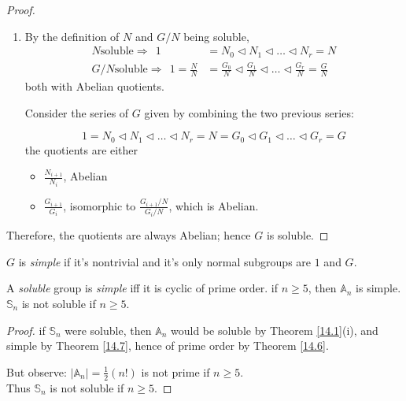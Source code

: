 \documentclass{article}
\theoremstyle{definition}
\newenvironment{defn}[1]
{\renewcommand\theinnerdefn{#1}\innerdefn}
{\endinnerdefn}
\newenvironment{thm}[1]
{\renewcommand\theinnerthm{#1}\innerthm}
{\endinnerthm}
\newenvironment{cor}[1]
{\renewcommand\theinnercor{#1}\innercor}
{\endinnercor}
\begin{document}
\begin{proof}
\begin{enumerate}
      (*): by the 2nd Isomorphism Theorem (\ref{2ndisothm}).

      The last quotient is a quotient of the Abelian group $G_{i+1}/G_i$, so it is Abelian.

      Hence, $\frac{G_{i+1}N}{G_i N}$ is also Abelian; so $\frac{G}{N}$ is soluble.

    \item
      By the definition of $N$ and $G/N$ being soluble,
      \begin{align*}
	N \text{soluble} \Longrightarrow~~ 1 &= N_0 \triangleleft N_1 \triangleleft \ldots \triangleleft N_r = N\\
	G/N \text{soluble} \Longrightarrow~~ 1= \frac{N}{N} &= \frac{G_0}{N} \triangleleft \frac{G_1}{N} \triangleleft \ldots \triangleleft \frac{G_r}{N} = \frac{G}{N}
    \end{align*}
    both with Abelian quotients.

    Consider the series of $G$ given by combining the two previous series:

    $$
      1 = N_0 \triangleleft N_1 \triangleleft \ldots \triangleleft N_r = N = G_0 \triangleleft G_1 \triangleleft \ldots \triangleleft G_r = G
    $$
    the quotients are either
    \begin{itemize}
      \item $\frac{N_{i+1}}{N_i}$, Abelian
      \item $\frac{G_{i+1}}{G_i}$, isomorphic to $\frac{G_{i+1}/N}{G_i/N}$,
	which is Abelian.
    \end{itemize}
  \end{enumerate}
  Therefore, the quotients are always Abelian; hence $G$ is soluble.
\end{proof}


\begin{defn}{14.5}
  $G$ is \emph{simple} if it's nontrivial and it's only normal subgroups are $1$ and $G$.
\end{defn}

\begin{thm}{14.6} \label{14.6}
  A \emph{soluble} group is \emph{simple} iff it is cyclic of prime order.
\end{thm}
\begin{thm}{14.7} \label{14.7}
  if $n \geq 5$, then $\mathbb{A}_n$ is simple.
\end{thm}
\begin{cor}{14.8}
  $\mathbb{S}_n$ is not soluble if $n \geq 5$.
\end{cor}
\begin{proof}
  if $\mathbb{S}_n$ were soluble, then $\mathbb{A}_n$ would be soluble by Theorem \ref{14.1}(i), and simple by Theorem \ref{14.7}, hence of prime order by Theorem \ref{14.6}.
  
  But observe: $|\mathbb{A}_n|=\frac{1}{2}(n!)$ is not prime if $n \geq 5$.\\
  Thus $\mathbb{S}_n$ is not soluble if $n \geq 5$.
\end{proof}
\end{document}
